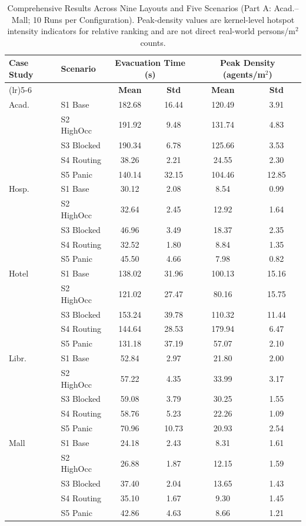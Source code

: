 \documentclass[utf8]{FrontiersinHarvard}
\begin{document}
\begin{table}[t]
\centering
\caption{Comprehensive Results Across Nine Layouts and Five Scenarios (Part A: Acad.--Mall; 10 Runs per Configuration). Peak-density values are kernel-level hotspot intensity indicators for relative ranking and are not direct real-world persons/m$^2$ counts.}
\label{tab:results_main}
{\tiny
\setlength{\tabcolsep}{2.5pt}
\renewcommand{\arraystretch}{0.86}
\begin{tabular}{>{\raggedright\arraybackslash}p{1.15cm}>{\raggedright\arraybackslash}p{1.30cm}cccc}
\toprule
\textbf{Case Study} & \textbf{Scenario} & \multicolumn{2}{c}{\textbf{Evacuation Time (s)}} & \multicolumn{2}{c}{\textbf{Peak Density (agents/m$^2$)}} \\
\cmidrule(lr){3-4} \cmidrule(lr){5-6}
& & \textbf{Mean} & \textbf{Std} & \textbf{Mean} & \textbf{Std} \\
\midrule
Acad. & S1 Base & 182.68 & 16.44 & 120.49 & 3.91 \\
 & S2 HighOcc & 191.92 & 9.48 & 131.74 & 4.83 \\
 & S3 Blocked & 190.34 & 6.78 & 125.66 & 3.53 \\
 & S4 Routing & 38.26 & 2.21 & 24.55 & 2.30 \\
 & S5 Panic & 140.14 & 32.15 & 104.46 & 12.85 \\
\midrule
Hosp. & S1 Base & 30.12 & 2.08 & 8.54 & 0.99 \\
 & S2 HighOcc & 32.64 & 2.45 & 12.92 & 1.64 \\
 & S3 Blocked & 46.96 & 3.49 & 18.37 & 2.35 \\
 & S4 Routing & 32.52 & 1.80 & 8.84 & 1.35 \\
 & S5 Panic & 45.50 & 4.66 & 7.98 & 0.82 \\
\midrule
Hotel & S1 Base & 138.02 & 31.96 & 100.13 & 15.16 \\
 & S2 HighOcc & 121.02 & 27.47 & 80.16 & 15.75 \\
 & S3 Blocked & 153.24 & 39.78 & 110.32 & 11.44 \\
 & S4 Routing & 144.64 & 28.53 & 179.94 & 6.47 \\
 & S5 Panic & 131.18 & 37.19 & 57.07 & 2.10 \\
\midrule
Libr. & S1 Base & 52.84 & 2.97 & 21.80 & 2.00 \\
 & S2 HighOcc & 57.22 & 4.35 & 33.99 & 3.17 \\
 & S3 Blocked & 59.08 & 3.79 & 30.25 & 1.55 \\
 & S4 Routing & 58.76 & 5.23 & 22.26 & 1.09 \\
 & S5 Panic & 70.96 & 10.73 & 20.93 & 2.54 \\
\midrule
Mall & S1 Base & 24.18 & 2.43 & 8.31 & 1.61 \\
 & S2 HighOcc & 26.88 & 1.87 & 12.15 & 1.59 \\
 & S3 Blocked & 37.40 & 2.04 & 13.65 & 1.43 \\
 & S4 Routing & 35.10 & 1.67 & 9.30 & 1.45 \\
 & S5 Panic & 42.86 & 4.63 & 8.66 & 1.21 \\
\bottomrule
\end{tabular}
}
\end{table}
\end{document}
